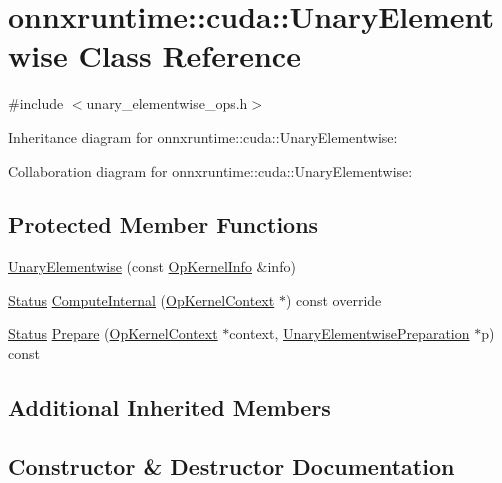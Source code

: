 \hypertarget{classonnxruntime_1_1cuda_1_1UnaryElementwise}{}\section{onnxruntime\+:\+:cuda\+:\+:Unary\+Elementwise Class Reference}
\label{classonnxruntime_1_1cuda_1_1UnaryElementwise}


{\ttfamily \#include $<$unary\+\_\+elementwise\+\_\+ops.\+h$>$}



Inheritance diagram for onnxruntime\+:\+:cuda\+:\+:Unary\+Elementwise\+:


Collaboration diagram for onnxruntime\+:\+:cuda\+:\+:Unary\+Elementwise\+:
\subsection*{Protected Member Functions}
\begin{DoxyCompactItemize}
\item 
\mbox{\hyperlink{classonnxruntime_1_1cuda_1_1UnaryElementwise_a592f03e4a1344568b75b12178aff8dfb}{Unary\+Elementwise}} (const \mbox{\hyperlink{classonnxruntime_1_1OpKernelInfo}{Op\+Kernel\+Info}} \&info)
\item 
\mbox{\hyperlink{classonnxruntime_1_1common_1_1Status}{Status}} \mbox{\hyperlink{classonnxruntime_1_1cuda_1_1UnaryElementwise_abbbcb29c3937e2ac9e2ad768d9c69fca}{Compute\+Internal}} (\mbox{\hyperlink{classonnxruntime_1_1OpKernelContext}{Op\+Kernel\+Context}} $\ast$) const override
\item 
\mbox{\hyperlink{classonnxruntime_1_1common_1_1Status}{Status}} \mbox{\hyperlink{classonnxruntime_1_1cuda_1_1UnaryElementwise_a4309faae3b11787992d9a2c47c225f95}{Prepare}} (\mbox{\hyperlink{classonnxruntime_1_1OpKernelContext}{Op\+Kernel\+Context}} $\ast$context, \mbox{\hyperlink{structonnxruntime_1_1cuda_1_1UnaryElementwisePreparation}{Unary\+Elementwise\+Preparation}} $\ast$p) const
\end{DoxyCompactItemize}
\subsection*{Additional Inherited Members}


\subsection{Constructor \& Destructor Documentation}
\mbox{\label{classonnxruntime_1_1cuda_1_1UnaryElementwise_a592f03e4a1344568b75b12178aff8dfb}} 
